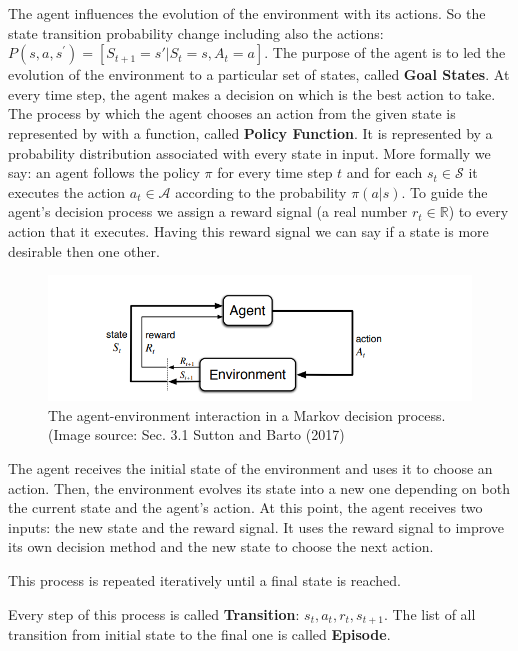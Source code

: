 The agent influences the evolution of the environment with its actions.
So the state transition probability change including also the actions: $P(s, a, s^{'}) = [S_{t+1} = s' | S_t = s, A_t = a] $.
The purpose of the agent is to led the evolution of the environment to a particular set of states, called \textbf{Goal States}.
At every time step, the agent makes a decision on which is the best action to take.
The process by which the agent chooses an action from the given state is represented by with a function, called \textbf{Policy Function}.
It is represented by a probability distribution associated with every state in input. 
More formally we say: an agent follows the policy $\pi$ for every time step $t$ and for each $s_t \in \mathcal{S}$ it executes the action $a_t \in \mathcal{A}$ according to the probability $\pi(a|s)$.
To guide the agent's decision process we assign a reward signal (a real number $r_t\in 	\mathbb{R}$) to every action that it executes. 
Having this reward signal we can say if a state is more desirable then one other.



\begin{figure}[h]
\includegraphics[width=\textwidth]{pictures/mdp_schema}
\caption{The agent-environment interaction in a Markov decision process. (Image source: Sec. 3.1 Sutton and Barto (2017) \cite{bib:2018Sutton_RLBook}}
\centering
\end{figure}


The agent receives the initial state of the environment and uses it to choose an action. 
Then, the environment evolves its state into a new one depending on both the current state and the agent's action. 
At this point, the agent receives two inputs: the new state and the reward signal.
It uses the reward signal to improve its own decision method and the new state to choose the next action.

This process is repeated iteratively until a final state is reached.

Every step of this process is called \textbf{Transition}: ${s_t,a_t,r_t,s_{t+1}}$.
The list of all transition from initial state to the final one is called \textbf{Episode}.

